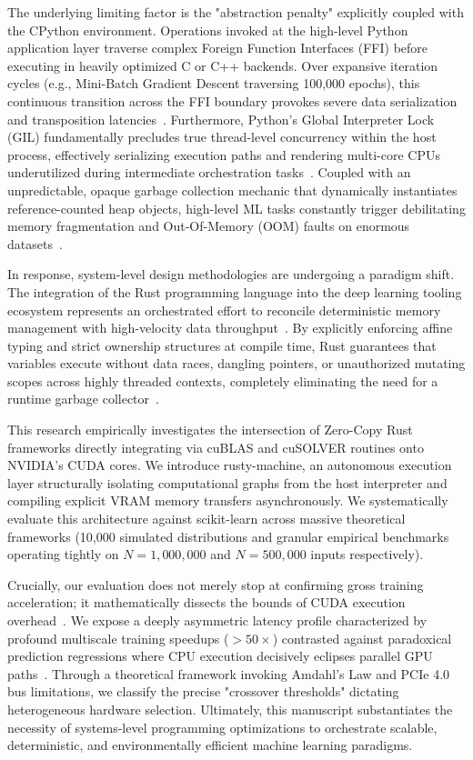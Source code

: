 \documentclass[conference]{IEEEtran}
\begin{document}
The underlying limiting factor is the "abstraction penalty" explicitly coupled with the CPython environment. Operations invoked at the high-level Python application layer traverse complex Foreign Function Interfaces (FFI) before executing in heavily optimized C or C++ backends. Over expansive iteration cycles (e.g., Mini-Batch Gradient Descent traversing 100,000 epochs), this continuous transition across the FFI boundary provokes severe data serialization and transposition latencies~\cite{ref5,ref6}. Furthermore, Python’s Global Interpreter Lock (GIL) fundamentally precludes true thread-level concurrency within the host process, effectively serializing execution paths and rendering multi-core CPUs underutilized during intermediate orchestration tasks~\cite{ref7}. Coupled with an unpredictable, opaque garbage collection mechanic that dynamically instantiates reference-counted heap objects, high-level ML tasks constantly trigger debilitating memory fragmentation and Out-Of-Memory (OOM) faults on enormous datasets~\cite{ref8,ref9}. 

In response, system-level design methodologies are undergoing a paradigm shift. The integration of the Rust programming language into the deep learning tooling ecosystem represents an orchestrated effort to reconcile deterministic memory management with high-velocity data throughput~\cite{ref20}. By explicitly enforcing affine typing and strict ownership structures at compile time, Rust guarantees that variables execute without data races, dangling pointers, or unauthorized mutating scopes across highly threaded contexts, completely eliminating the need for a runtime garbage collector~\cite{ref11}. 

This research empirically investigates the intersection of Zero-Copy Rust frameworks directly integrating via cuBLAS and cuSOLVER routines onto NVIDIA's CUDA cores. We introduce rusty-machine, an autonomous execution layer structurally isolating computational graphs from the host interpreter and compiling explicit VRAM memory transfers asynchronously. We systematically evaluate this architecture against scikit-learn across massive theoretical frameworks (10,000 simulated distributions and granular empirical benchmarks operating tightly on $N=1,000,000$ and $N=500,000$ inputs respectively). 

Crucially, our evaluation does not merely stop at confirming gross training acceleration; it mathematically dissects the bounds of CUDA execution overhead~\cite{ref12}. We expose a deeply asymmetric latency profile characterized by profound multiscale training speedups ($>50\times$) contrasted against paradoxical prediction regressions where CPU execution decisively eclipses parallel GPU paths~\cite{ref13}. Through a theoretical framework invoking Amdahl's Law and PCIe 4.0 bus limitations, we classify the precise "crossover thresholds" dictating heterogeneous hardware selection. Ultimately, this manuscript substantiates the necessity of systems-level programming optimizations to orchestrate scalable, deterministic, and environmentally efficient machine learning paradigms.
\end{document}
